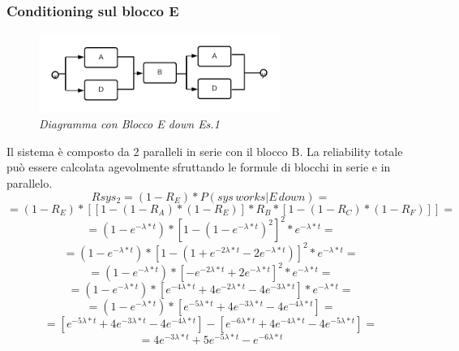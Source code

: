 \subsubsection{Conditioning sul blocco E}
\begin{figure}[H]
	\centering
	\includegraphics[width=0.7\textwidth]{img/hw5/e_down.png}
	\caption{\textit{Diagramma con Blocco E down Es.1}}
\end{figure}
Il sistema è composto da 2 paralleli in serie con il blocco B. La reliability totale può essere calcolata agevolmente sfruttando le formule di blocchi in serie e in parallelo.
\begin{equation*}
	Rsys_2 = (1-R_E)*P(sys\,works|E\,down)=
\end{equation*}
\begin{equation*}
	 = (1-R_E)*[[1-(1-R_A)*(1-R_E)]*R_B*[1-(1-R_C)*(1-R_F)]] =
\end{equation*}
\begin{equation*}
	= (1-e^{-\lambda*t})*[1-(1-e^{-\lambda*t})^{2}]^{2}*e^{-\lambda*t}=
\end{equation*}
\begin{equation*}
	= (1-e^{-\lambda*t})*[1-(1+e^{-2\lambda*t}-2e^{-\lambda*t})]^{2}*e^{-\lambda*t}=
\end{equation*}
\begin{equation*}
	= (1-e^{-\lambda*t})*[-e^{-2\lambda*t}+2e^{-\lambda*t}]^{2}*e^{-\lambda*t}=
\end{equation*}
\begin{equation*}
	= (1-e^{-\lambda*t})*[e^{-4\lambda*t}+4e^{-2\lambda*t}-4e^{-3\lambda*t}]*e^{-\lambda*t}=
\end{equation*}
\begin{equation*}
	= (1-e^{-\lambda*t})*[e^{-5\lambda*t}+4e^{-3\lambda*t}-4e^{-4\lambda*t}]=
\end{equation*}
\begin{equation*}
	= [e^{-5\lambda*t}+4e^{-3\lambda*t}-4e^{-4\lambda*t}] - [e^{-6\lambda*t}+4e^{-4\lambda*t}-4e^{-5\lambda*t}]=
\end{equation*}
\begin{equation*}
	= 4e^{-3\lambda*t}+5e^{-5\lambda*t}-e^{-6\lambda*t}
\end{equation*}
